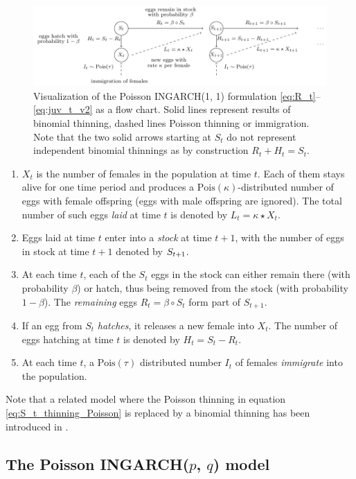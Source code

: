 \documentclass[review]{elsarticle}
\begin{document}
\begin{figure}
\center
\includegraphics[scale=0.85]{figure/flowchart_ingarch_poisson.pdf}
\caption{Visualization of the Poisson INGARCH(1, 1) formulation \eqref{eq:R_t}--\eqref{eq:juv_t_v2} as a flow chart. Solid lines represent results of binomial thinning, dashed lines Poisson thinning or immigration. Note that the two solid arrows starting at $S_t$ do not represent independent binomial thinnings as by construction  $R_t + H_t = S_t$.}
\label{fig:ingarch_flowchart_poisson}
\end{figure}

\begin{enumerate}
\item $X_t$ is the number of females in the population at time $t$. Each of them stays alive for one time period and produces a $\text{Pois}(\kappa)$-distributed number of eggs with female offspring (eggs with male offspring are ignored). The total number of such eggs \textit{laid} at time $t$ is denoted by $L_t = \kappa \star X_t$.
\item Eggs laid at time $t$ enter into a \textit{stock} at time $t + 1$, with the number of eggs in stock at time $t + 1$ denoted by $S_{t + 1}$.
\item At each time $t$, each of the $S_t$ eggs in the stock can either remain there (with probability $\beta$) or hatch, thus being removed from the stock (with probability $1 - \beta$). The \textit{remaining} eggs $R_t = \beta \circ S_t$ form part of $S_{t + 1}$.
\item If an egg from $S_t$ \textit{hatches}, it releases a new female into $X_t$. The number of eggs hatching at time $t$ is denoted by $H_t = S_t - R_t$.
\item At each time $t$, a $\text{Pois}(\tau)$ distributed number $I_t$ of females \textit{immigrate} into the population.
\end{enumerate}
Note that a related model where the Poisson thinning in equation \eqref{eq:S_t_thinning_Poisson} is replaced by a binomial thinning has been introduced in \cite{Bracher2019}.

\subsection{The Poisson INGARCH($p$, $q$) model}
\label{subsec:poissonpq}
\end{document}
